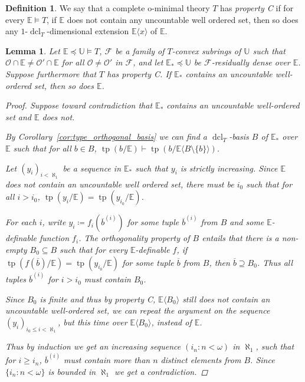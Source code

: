 \documentclass{amsart}
\newtheorem{lemma}[theorem]{Lemma}
\theoremstyle{remark}
\theoremstyle{definition}
\newtheorem{definition}[theorem]{Definition}
\theoremstyle{plain}
\newcommand{\bE}{\mathbb E}
\newcommand{\bU}{\mathbb U}
\newcommand{\cF}{\mathcal F}
\newcommand{\cO}{\mathcal O}
\DeclareMathOperator{\tp}{\mathrm{tp}}
\DeclareMathOperator{\dcl}{\mathrm{dcl}}
\theoremstyle{plain}
\begin{document}
\begin{definition}
    We say that a complete o-minimal theory $T$ has \emph{property C} if for every $\bE \models T$, if $\bE$ does not contain any uncountable well ordered set, then so does any $1$-$\dcl_T$-dimensional extension $\bE \langle x \rangle$ of $\bE$.
\end{definition}

\begin{lemma}
    Let $\bE \preceq \bU \models T$, $\cF$ be a family of $T$-convex subrings of $\bU$ such that $\cO \cap \bE \neq \cO' \cap \bE$ for all $\cO \neq \cO'$ in $\cF$, and let $\bE_* \preceq \bU$ be $\cF$-residually dense over $\bE$. Suppose furthermore that $T$ has property C. If $\bE_*$ contains an uncountable well-ordered set, then so does $\bE$.
    \begin{proof}
        Suppose toward contradiction that $\bE_*$ contains an uncountable well-ordered set and $\bE$ does not.

        By Corollary~\ref{cor:type_orthogonal_basis} we can find a $\dcl_T$-basis $B$ of $\bE_*$ over $\bE$ such that for all $b \in B$, $\tp(b/\bE)\vdash \tp(b/\bE \langle B \setminus \{b\} \rangle)$.

        Let $(y_i)_{i<\aleph_1}$ be a sequence in $\bE_*$ such that $y_i$ is strictly increasing. Since $\bE$ does not contain an uncountable well ordered set, there must be $i_0$ such that for all $i>i_0$, $\tp(y_i/\bE)=\tp(y_{i_0}/\bE)$.
        
        For each $i$, write $y_i\coloneqq f_i(\overline{b}^{(i)})$ for some tuple $\overline{b}^{(i)}$ from $B$ and some $\bE$-definable function $f_i$.
        The orthogonality property of $B$ entails that there is a non-empty $B_0\subseteq B$ such that for every $\bE$-definable $f$, if $\tp(f(\overline{b})/\bE)=\tp(y_{i_0}/\bE)$ for some tuple $\overline{b}$ from $B$, then $\overline{b}\supseteq B_0$. Thus all tuples $\overline{b}^{(i)}$ for $i>i_0$ must contain $B_0$.

        Since $B_0$ is finite and thus by property C, $\bE \langle B_0\rangle$ still does not contain an uncountable well-ordered set, we can repeat the argument on the sequence $(y_i)_{i_0\le i<\aleph_1}$, but this time over $\bE \langle B_0\rangle$, instead of $\bE$.
        
        Thus by induction we get an increasing sequence $(i_{n}: n < \omega)$ in $\aleph_1$, such that for $i\ge i_n$, $\overline{b}^{(i)}$ must contain more than $n$ distinct elements from $B$. Since $\{i_{n}: n < \omega\}$ is bounded in $\aleph_1$ we get a contradiction.
    \end{proof}
\end{lemma}
\end{document}
